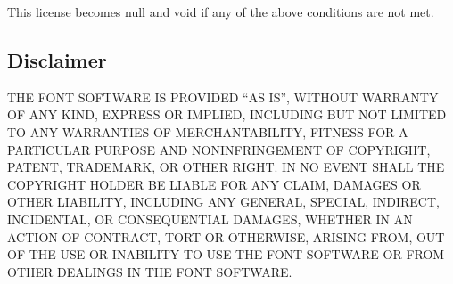 \documentclass[paper=a4, 10pt]{scrbook}
\begin{document}
This license becomes null and void if any of the above conditions are not met.

\subsection{Disclaimer}

 THE FONT SOFTWARE IS PROVIDED “AS IS”, WITHOUT WARRANTY OF ANY KIND, EXPRESS OR IMPLIED, INCLUDING BUT NOT LIMITED TO ANY WARRANTIES OF MERCHANTABILITY, FITNESS FOR A PARTICULAR PURPOSE AND NONINFRINGEMENT OF COPYRIGHT, PATENT, TRADEMARK, OR OTHER RIGHT. IN NO EVENT SHALL THE COPYRIGHT HOLDER BE LIABLE FOR ANY CLAIM, DAMAGES OR OTHER LIABILITY, INCLUDING ANY GENERAL, SPECIAL, INDIRECT, INCIDENTAL, OR CONSEQUENTIAL DAMAGES, WHETHER IN AN ACTION OF CONTRACT, TORT OR OTHERWISE, ARISING FROM, OUT OF THE USE OR INABILITY TO USE THE FONT SOFTWARE OR FROM OTHER DEALINGS IN THE FONT SOFTWARE.
\end{document}
